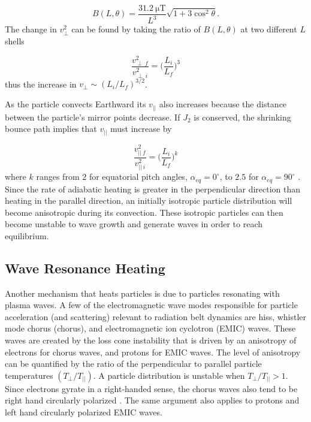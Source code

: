 \begin{equation}
B(L, \theta) = \frac{31.2 \ \mathrm{\mu T}}{L^3}\sqrt{1 + 3 \cos^2 \theta}.
\end{equation} The change in $v^2_{\perp}$ can be found by taking the ratio of $B(L, \theta)$ at two different $L$ shells

\begin{equation}
\frac{v_{\perp \ f}^2}{v_{\perp \ i}^2} = \bigg( \frac{L_i}{L_f} \bigg)^3
\end{equation} thus the increase in $v_\perp \sim (L_i/L_f)^{3/2}$.

As the particle convects Earthward its $v_{||}$ also increases because the distance between the particle's mirror points decrease. If $J_2$ is conserved, the shrinking bounce path implies that $v_{||}$ must increase by 

\begin{equation}
\frac{v_{|| \ f}^2}{v_{|| \ i}^2} = \bigg( \frac{L_i}{L_f} \bigg)^k
\end{equation} where $k$ ranges from $2$ for equatorial pitch angles, $\alpha_{eq} = 0^\circ$, to $2.5$ for $\alpha_{eq} = 90^\circ$ \citep{Baumjohann1997}. Since the rate of adiabatic heating is greater in the perpendicular direction than heating in the parallel direction, an initially isotropic particle distribution will become anisotropic during its convection. These isotropic particles can then become unstable to wave growth and generate waves in order to reach equilibrium.


\subsection{Wave Resonance Heating}\label{Intro:wave_heating}
Another mechanism that heats particles is due to particles resonating with plasma waves. A few of the electromagnetic wave modes responsible for particle acceleration (and scattering) relevant to radiation belt dynamics are hiss, whistler mode chorus (chorus), and electromagnetic ion cyclotron (EMIC) waves. These waves are created by the loss cone instability that is driven by an anisotropy of electrons for chorus waves, and protons for EMIC waves. The level of anisotropy can be quantified by the ratio of the perpendicular to parallel particle temperatures $(T_\perp/T_{||})$. A particle distribution is unstable when $T_\perp/T_{||} > 1$. Since electrons gyrate in a right-handed sense, the chorus waves also tend to be right hand circularly polarized \citep{Tsurutani1997}. The same argument also applies to protons and left hand circularly polarized EMIC waves. 

